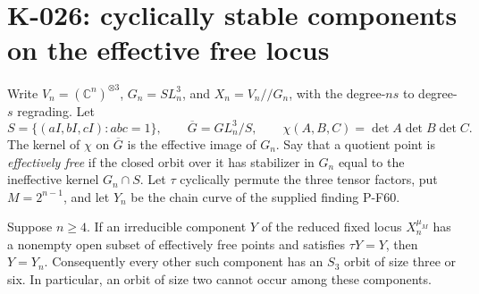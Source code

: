 \section{K-026: cyclically stable components on the effective free locus}

Write $V_n=(\mathbb C^n)^{\otimes3}$, $G_n=SL_n^3$, and
$X_n=V_n/\!/G_n$, with the degree-$ns$ to degree-$s$ regrading.
Let
\[
 S=\{(aI,bI,cI):abc=1\},\qquad
 \overline G=GL_n^3/S,
 \qquad \chi(A,B,C)=\det A\det B\det C.
\]
The kernel of $\chi$ on $\overline G$ is the effective image
of $G_n$.  Say that a quotient point is \emph{effectively free}
if the closed orbit over it has stabilizer in $G_n$ equal to the
ineffective kernel $G_n\cap S$.
Let $\tau$ cyclically permute the three tensor factors, put
$M=2^{n-1}$, and let $Y_n$ be the chain curve of the supplied
finding P-F60.

\begin{proposition}[K-026a]
Suppose $n\ge4$.  If an irreducible component $Y$ of the reduced
fixed locus $X_n^{\mu_M}$ has a nonempty open subset of effectively
free points and satisfies $\tau Y=Y$, then $Y=Y_n$.
Consequently every other such component has an $S_3$ orbit of
size three or six.  In particular, an orbit of size two cannot
occur among these components.
\end{proposition}

